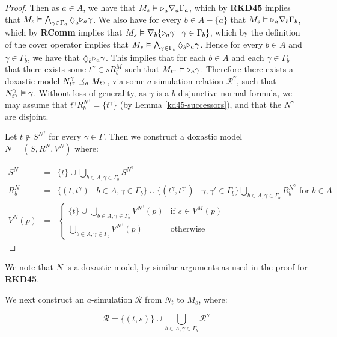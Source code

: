 \begin{proof}
Then as $a \in A$, we have that $M_s \vDash {\ensuremath{\mathopen{\triangleright}}}_a \nabla_a \Gamma_a$,
which by {\bf RKD45} implies that $M_s \entails \bigwedge_{\gamma \in
\Gamma_a} \suspects_a \somerefs_a \gamma$. We also have for every $b \in A -
\{a\}$ that $M_s \vDash {\ensuremath{\mathopen{\triangleright}}}_a \nabla_b \Gamma_b$, which by {\bf RComm}
implies that $M_s \vDash \nabla_b \{{\mathopen{\triangleright}}_a \gamma \mid \gamma \in
\Gamma_b\}$, which by the definition of the cover operator implies that $M_s
\entails \bigwedge_{\gamma \in \Gamma_b} \suspects_b \somerefs_a \gamma$.
Hence for every $b \in A$ and $\gamma \in \Gamma_b$, we have that $\suspects_b
\somerefs_a \gamma$. This implies that for each $b \in A$ and each $\gamma \in
\Gamma_b$ that there exists some $t^{\gamma} \in sR^M_b$ such that
$M_{t^\gamma} \vDash {\ensuremath{\mathopen{\triangleright}}}_a \gamma$. Therefore there exists a doxastic
model $N^\gamma_{t^\gamma} \preceq_a M_{t^\gamma}$, via some $a$-simulation
relation $\mathcal{R}^\gamma$, such that $N^\gamma_{t^\gamma} \vDash \gamma$.
Without loss of generality, as $\gamma$ is a $b$-disjunctive normal formula, we
may assume that $t^\gamma R^{N^\gamma}_b = \{t^\gamma\}$ (by Lemma
\ref{kd45-successors}), and that the $N^\gamma$ are disjoint.

Let $t \notin S^{N^\gamma}$ for every $\gamma \in \Gamma$.
Then we construct a doxastic model $N = (S, R^N, V^N)$ where:

\begin{eqnarray*}
S^N &=& \{t\} \cup \bigcup_{b \in A, \gamma \in \Gamma_b} S^{N^\gamma}\\
R^N_b &=& \{(t, t^{\gamma}) \mid b \in A, \gamma \in \Gamma_b\} 
\cup \{(t^\gamma, t^{\gamma'}) \mid \gamma, \gamma' \in \Gamma_b\}
\bigcup_{b \in A, \gamma \in \Gamma_b} R^{N^\gamma}_b \text{ for $b \in A$}\\
V^N(p) &=& 
\begin{cases}
\{t\} \cup \bigcup_{b \in A, \gamma \in \Gamma_b} V^{N^\gamma}(p) & \text{if $s
\in V^M(p)$}\\
\bigcup_{b \in A, \gamma \in \Gamma_b} V^{N^\gamma}(p) & \text{otherwise}
\end{cases}
\end{eqnarray*}
\end{proof}

We note that $N$ is a doxastic model, by similar arguments as used in the proof
for {\bf RKD45}.

We next construct an $a$-simulation $\mathcal{R}$ from $N_t$ to $M_s$, where:

$$\mathcal{R} = \{(t, s)\} \cup \bigcup_{b \in A, \gamma \in \Gamma_b}
\mathcal{R}^\gamma$$

